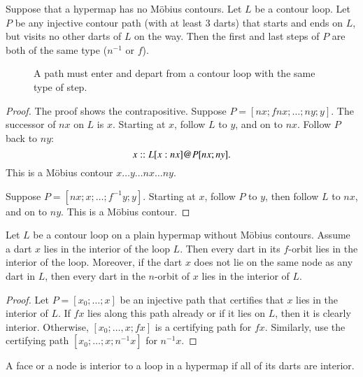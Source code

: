 \begin{lemma}
Suppose that a hypermap has no M\"obius contours. Let $L$ be a contour loop.  Let $P$ be any injective contour path (with at least $3$ darts) that starts and ends on $L$, but visits no other darts of $L$ on the way.  Then the first and last steps of $P$ are both of the same type ($n^{-1}$ or $f$).
\end{lemma}

\begin{figure}[htb]
  \centering
  \caption{A path must enter and depart from a contour loop with the same type of step.}
  \label{fig:interior_nf}
\end{figure}


\begin{proof}   The proof shows the contrapositive.   Suppose $P=[n x;f n x;\ldots;n y;y]$.   The successor of $n x$ on $L$ is $x$.  Starting at $x$,  follow $L$ to $y$, and on to $n x$.  Follow $P$ back to $n y$:
$$
x::L[x:n x] {{\operatorname{@}}} P[ n x;ny].
$$  
This is a M\"obius contour $x\ldots y\ldots n x\ldots n y$.

Suppose $P=[n x;x;\ldots;f^{-1} y;y]$.  Starting at $x$, follow $P$ to $y$, then follow $L$ to $n x$, and  on to $n y$.  This is a M\"obius contour.
\end{proof}

\begin{lemma}
Let $L$ be a contour loop on a plain hypermap without
M\"obius contours.  Assume a dart $x$ lies in the interior of the loop $L$. 
Then every dart in its $f$-orbit lies in
the interior of the loop.  Moreover, if the dart
$x$ does not lie on the same node as any dart in $L$, then every
dart in the $n$-orbit of $x$ lies in the interior 
of $L$.
\end{lemma}

\begin{proof} Let $P= [x_0;\ldots;x]$ be an injective path that certifies that $x$ lies in the interior of $L$.  If $f x$ lies along this path already or if it lies on $L$, then it is clearly interior.  Otherwise, $[x_0;\ldots,x;f x]$ is a certifying path for $f x$.  Similarly, use the certifying path $[x_0;\ldots;x;n^{-1} x]$ for $n^{-1} x$.
\end{proof}


\begin{definition}  A face or a node is interior to a
loop in a hypermap if all of its darts are interior.
\end{definition}


